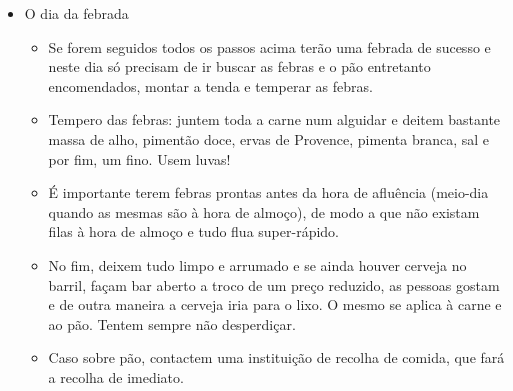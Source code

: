 \begin{itemize}
    \item O dia da febrada
    \begin{itemize}
        \item Se forem seguidos todos os passos acima terão uma febrada de sucesso e neste dia só precisam de ir buscar as febras e o pão entretanto encomendados, montar a tenda e temperar as febras.
        \item Tempero das febras: juntem toda a carne num alguidar e deitem bastante massa de alho, pimentão doce, ervas de Provence, pimenta branca, sal e por fim, um fino. Usem luvas!
        \item É importante terem febras prontas antes da hora de afluência (meio-dia quando as mesmas são à hora de almoço), de modo a que não existam filas à hora de almoço e tudo flua super-rápido.
        \item No fim, deixem tudo limpo e arrumado e se ainda houver cerveja no barril, façam bar aberto a troco de um preço reduzido, as pessoas gostam e de outra maneira a cerveja iria para o lixo. O mesmo se aplica à carne e ao pão. Tentem sempre não desperdiçar.
        \item Caso sobre pão, contactem uma instituição de recolha de comida, que fará a recolha de imediato.
    \end{itemize}
\end{itemize}